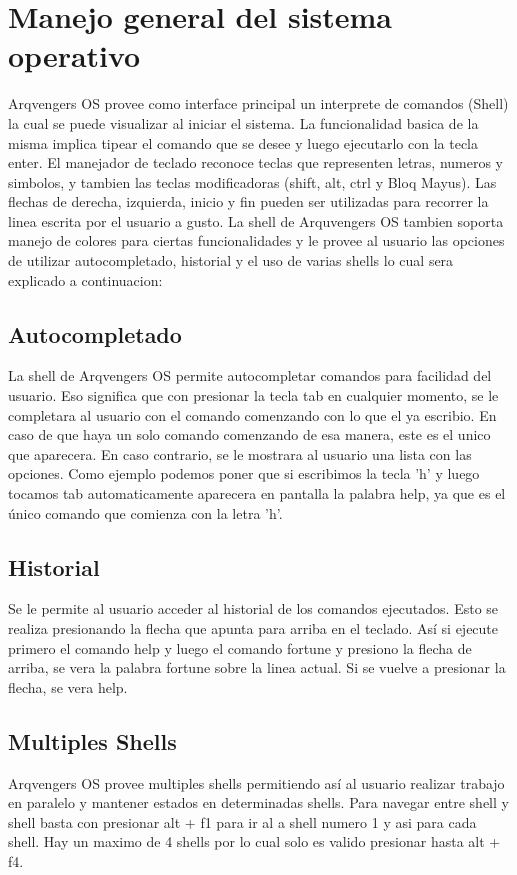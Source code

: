 \documentclass[a4paper,10pt]{article}
\begin{document}
\section{Manejo general del sistema operativo}
    Arqvengers OS provee como interface principal un interprete de comandos (Shell) la cual se puede visualizar al iniciar el sistema. La funcionalidad basica de la misma implica tipear el comando que se desee y luego ejecutarlo con la tecla enter. El manejador de teclado reconoce teclas que representen letras, numeros y simbolos, y tambien las teclas modificadoras (shift, alt, ctrl y Bloq Mayus). Las flechas de derecha, izquierda, inicio y fin pueden ser utilizadas para recorrer la linea escrita por el usuario a gusto.
    La shell de Arquvengers OS tambien soporta manejo de colores para ciertas funcionalidades y le provee al usuario las opciones de utilizar autocompletado, historial y el uso de varias shells lo cual sera explicado a continuacion:

    \subsection{Autocompletado}
        La shell de Arqvengers OS permite autocompletar comandos para facilidad del usuario. Eso significa que con presionar la tecla tab en cualquier momento, se le completara al usuario con el comando comenzando con lo que el ya escribio. En caso de que haya un solo comando comenzando de esa manera, este es el unico que aparecera. En caso contrario, se le mostrara al usuario una lista con las opciones. Como ejemplo podemos poner que si escribimos la tecla 'h' y luego tocamos tab automaticamente aparecera en pantalla la palabra help, ya que es el único comando que comienza con la letra 'h'.
    \subsection{Historial}
        Se le permite al usuario acceder al historial de los comandos ejecutados. Esto se realiza presionando la flecha que apunta para arriba en el teclado. Así si ejecute primero el comando help y luego el comando fortune y presiono la flecha de arriba, se vera la palabra fortune sobre la linea actual. Si se vuelve a presionar la flecha, se vera help.
    \subsection{Multiples Shells}
        Arqvengers OS provee multiples shells permitiendo así al usuario realizar trabajo en paralelo y mantener estados en determinadas shells. Para navegar entre shell y shell basta con presionar alt + f1 para ir al a shell numero 1 y asi para cada shell. Hay un maximo de 4 shells por lo cual solo es valido presionar hasta alt + f4.
\end{document}
